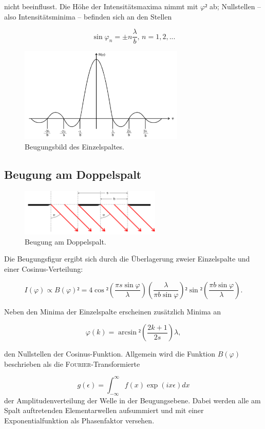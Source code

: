 nicht beeinflusst.
Die Höhe der Intensitätsmaxima nimmt mit $\varphi²$ ab; Nullstellen -- also Intensitätsminima -- befinden sich an den Stellen

\begin{equation}
	\sin\varphi_n=\pm n\frac{\lambda}{b},\,n=1,2,.. .
\end{equation}

\begin{figure}
	\centering
	\includegraphics[width=0.7\textwidth]{Bilder/Beugungsbild.pdf}
	\caption{Beugungsbild des Einzelspaltes.\cite{V406}}
\end{figure}

\subsection{Beugung am Doppelspalt}
\begin{figure}
	\centering
	\includegraphics[width=0.6\textwidth]{Bilder/Doppelspalt.pdf}
	\caption{Beugung am Doppelspalt.\cite{V406}}
\end{figure}

Die Beugungsfigur ergibt sich durch die Überlagerung zweier Einzelspalte und einer Cosinus-Verteilung:

\begin{equation}
	I(\varphi)\propto B(\varphi)²=4\cos²{\left(\frac{\pi s \sin\varphi}{\lambda}\right)}\left(\frac{\lambda}{\pi b \sin\varphi}\right)²\sin²{\left(\frac{\pi b \sin\varphi}{\lambda}\right)}.
	\label{eq:regress2}
\end{equation}

Neben den Minima der Einzelspalte erscheinen zusätzlich Minima an 

\begin{equation}
	\varphi(k)=\arcsin²{\left(\frac{2k+1}{2s}\right)}\lambda,
\end{equation}

den Nullstellen der Cosinus-Funktion.
Allgemein wird die Funktion $B(\varphi)$ beschrieben als die \textsc{Fourier}-Transformierte

\begin{equation}
	g(\epsilon)=\int _{-\infty}^\infty { f(x)\exp{\left(ix\epsilon\right)} dx}
\end{equation}
der Amplitudenverteilung der Welle in der Beugungsebene.
Dabei werden alle am Spalt auftretenden Elementarwellen aufsummiert und mit einer Exponentialfunktion als Phasenfaktor versehen.
